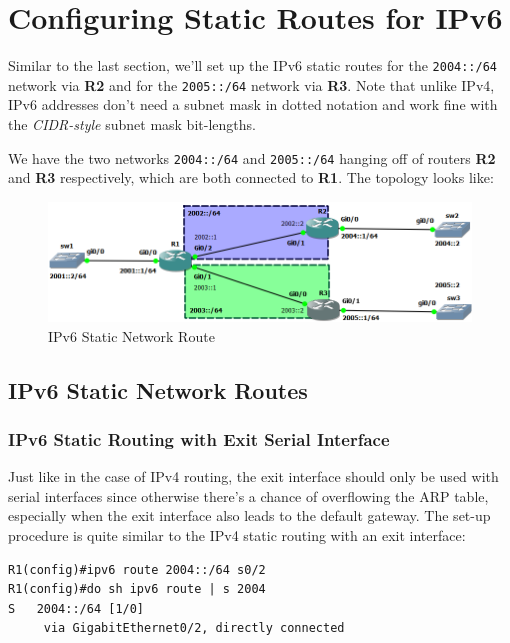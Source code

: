 \section{Configuring Static Routes for IPv6}
Similar to the last section, we'll set up the IPv6 static routes for the \verb|2004::/64| network via \textbf{R2} and for the \verb|2005::/64| network via \textbf{R3}. Note that unlike IPv4, IPv6 addresses don't need a subnet mask in dotted notation and work fine with the \textit{CIDR-style} subnet mask bit-lengths. 

We have the two networks \verb|2004::/64| and \verb|2005::/64| hanging off of routers \textbf{R2} and \textbf{R3} respectively, which are both connected to \textbf{R1}. The topology looks like:

\begin{figure}[H]
\centering
\includegraphics[width=0.9\linewidth]{"ICND1/2. Routers/chapters/3.2.a IPv6 Static Network Route"}
\caption{IPv6 Static Network Route}
\label{fig:9.2.a}
\end{figure}

\subsection{IPv6 Static Network Routes}
\subsubsection{IPv6 Static Routing with Exit Serial Interface}
Just like in the case of IPv4 routing, the exit interface should only be used with serial interfaces since otherwise there's a chance of overflowing the ARP table, especially when the exit interface also leads to the default gateway. The set-up procedure is quite similar to the IPv4 static routing with an exit interface: 

\vspace{-15pt}
\begin{verbatim}
R1(config)#ipv6 route 2004::/64 s0/2
R1(config)#do sh ipv6 route | s 2004
S   2004::/64 [1/0]
     via GigabitEthernet0/2, directly connected
\end{verbatim}
\vspace{-10pt}

